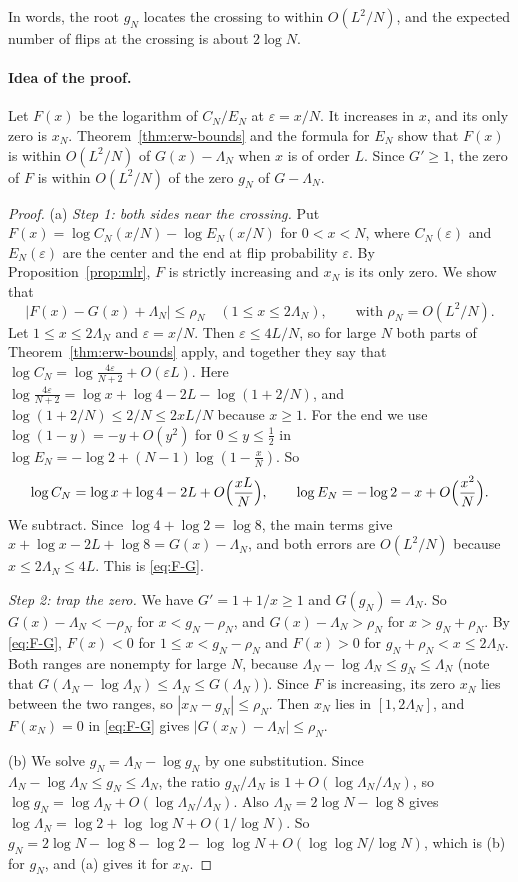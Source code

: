 In words, the root $g_N$ locates the crossing to within $O(L^2/N)$, and the
expected number of flips at the crossing is about $2\log N$.

\paragraph{Idea of the proof.}
Let $F(x)$ be the logarithm of $C_N/E_N$ at $\varepsilon=x/N$. It increases
in $x$, and its only zero is $x_N$. Theorem~\ref{thm:erw-bounds} and the
formula for $E_N$ show that $F(x)$ is within $O(L^2/N)$ of $G(x)-\Lambda_N$
when $x$ is of order $L$. Since $G'\ge1$, the zero of $F$ is within
$O(L^2/N)$ of the zero $g_N$ of $G-\Lambda_N$.

\begin{proof}
(a) \emph{Step 1: both sides near the crossing.} Put
$F(x)=\log C_N(x/N)-\log E_N(x/N)$ for $0<x<N$, where $C_N(\varepsilon)$ and
$E_N(\varepsilon)$ are the center and the end at flip probability
$\varepsilon$. By Proposition~\ref{prop:mlr}, $F$ is strictly increasing and
$x_N$ is its only zero. We show that
\begin{equation}\tag{$\ast$}\label{eq:F-G}
 \lvert F(x)-G(x)+\Lambda_N\rvert\le\rho_N\quad(1\le x\le2\Lambda_N),
 \qquad\text{with }\rho_N=O(L^2/N).
\end{equation}
Let $1\le x\le2\Lambda_N$ and $\varepsilon=x/N$. Then
$\varepsilon\le4L/N$, so for large $N$ both parts of
Theorem~\ref{thm:erw-bounds} apply, and together they say that
$\log C_N=\log\frac{4\varepsilon}{N+2}+O(\varepsilon L)$. Here
$\log\frac{4\varepsilon}{N+2}=\log x+\log4-2L-\log(1+2/N)$, and
$\log(1+2/N)\le2/N\le2xL/N$ because $x\ge1$. For the end we use
$\log(1-y)=-y+O(y^2)$ for $0\le y\le\frac12$ in
$\log E_N=-\log2+(N-1)\log(1-\frac xN)$. So
\[
 \log C_N=\log x+\log4-2L+O\Bigl(\frac{xL}N\Bigr),\qquad
 \log E_N=-\log2-x+O\Bigl(\frac{x^2}N\Bigr).
\]
We subtract. Since $\log4+\log2=\log8$, the main terms give
$x+\log x-2L+\log8=G(x)-\Lambda_N$, and both errors are $O(L^2/N)$ because
$x\le2\Lambda_N\le4L$. This is \eqref{eq:F-G}.

\emph{Step 2: trap the zero.} We have $G'=1+1/x\ge1$ and $G(g_N)=\Lambda_N$.
So $G(x)-\Lambda_N<-\rho_N$ for $x<g_N-\rho_N$, and
$G(x)-\Lambda_N>\rho_N$ for $x>g_N+\rho_N$. By \eqref{eq:F-G}, $F(x)<0$ for
$1\le x<g_N-\rho_N$ and $F(x)>0$ for $g_N+\rho_N<x\le2\Lambda_N$. Both ranges
are nonempty for large $N$, because
$\Lambda_N-\log\Lambda_N\le g_N\le\Lambda_N$ (note that
$G(\Lambda_N-\log\Lambda_N)\le\Lambda_N\le G(\Lambda_N)$). Since $F$ is
increasing, its zero $x_N$ lies between the two ranges, so
$|x_N-g_N|\le\rho_N$. Then $x_N$ lies in $[1,2\Lambda_N]$, and $F(x_N)=0$ in
\eqref{eq:F-G} gives $|G(x_N)-\Lambda_N|\le\rho_N$.

(b) We solve $g_N=\Lambda_N-\log g_N$ by one substitution. Since
$\Lambda_N-\log\Lambda_N\le g_N\le\Lambda_N$, the ratio $g_N/\Lambda_N$ is
$1+O(\log\Lambda_N/\Lambda_N)$, so
$\log g_N=\log\Lambda_N+O(\log\Lambda_N/\Lambda_N)$. Also
$\Lambda_N=2\log N-\log8$ gives
$\log\Lambda_N=\log2+\log\log N+O(1/\log N)$. So
$g_N=2\log N-\log8-\log2-\log\log N+O(\log\log N/\log N)$, which is (b) for
$g_N$, and (a) gives it for $x_N$.
\end{proof}

